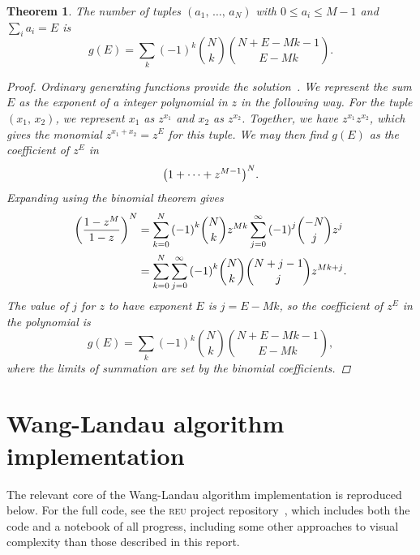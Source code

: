 \documentclass[aps,reprint,floatfix]{revtex4-2}
\theoremstyle{plain}
\newtheorem{thm}{Theorem}[section]
\theoremstyle{definition}
\renewcommand\leq\leqslant%
\begin{document}
\begin{thm}\label{thm:bw-g}
  The number of tuples $(a_1,\, \ldots,\, a_N)$ with $0 \leq a_i \leq M - 1$ and
  $\sum_i a_i = E$ is
  \[
    g(E)
    = \sum_k {(-1)}^k \binom{N}{k} \binom{N + E - Mk - 1}{E - Mk}.
  \]
  \begin{proof}
    Ordinary generating functions provide the solution~\cite{genfunc}. We represent the sum $E$
    as the exponent of a integer polynomial in $z$ in the following way. For the
    tuple $(x_1,\, x_2)$, we represent $x_1$ as $z^{x_1}$ and $x_2$ as
    $z^{x_2}$. Together, we have $z^{x_1} z^{x_2}$, which gives the monomial
    $z^{x_1 + x_2} = z^E$ for this tuple. We may then find $g(E)$ as the
    coefficient of $z^E$ in
    \[
      {\qty(1 + \cdots + z^{M-1})}^N.
    \]
    Expanding using the binomial theorem gives
    \begin{align}
      {\qty(\frac{1 - z^M}{1 - z})}^N
      &= \sum_{k=0}^N {(-1)}^k \binom{N}{k} z^{Mk}
      \sum_{j=0}^\infty {(-1)}^j \binom{-N}{j} z^j \\
      &= \sum_{k=0}^N \sum_{j=0}^\infty {(-1)}^k \binom{N}{k}
      \binom{N + j - 1}{j} z^{Mk + j}.
    \end{align}
    The value of $j$ for $z$ to have exponent $E$ is $j = E - Mk$, so the
    coefficient of $z^E$ in the polynomial is
    \begin{equation}
      g(E)
      = \sum_k {(-1)}^k \binom{N}{k} \binom{N + E - Mk - 1}{E - Mk},
    \end{equation}
    where the limits of summation are set by the binomial coefficients.
  \end{proof}
\end{thm}

\section{Wang-Landau algorithm implementation}\label{sec:wanglandau-core}

The relevant core of the Wang-Landau algorithm implementation is reproduced
below. For the full code, see the \textsc{reu} project
repository~\cite{rpi-reu-notebook}, which includes both the code and a notebook
of all progress, including some other approaches to visual complexity than those
described in this report.

\inputminted{python}{wanglandau-core.py}

\hypersetup{urlcolor=Mahogany}

\end{document}
